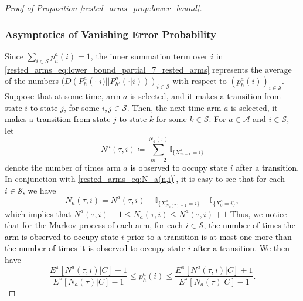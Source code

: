 \begin{proof}[Proof of Proposition \ref{rested_arms_prop:lower_bound}]
\subsubsection{Asymptotics of Vanishing Error Probability}
Since $\sum\limits_{i\in \mathcal{S}}p_h^a(i)=1$, the inner summation term over $i$ in \eqref{rested_arms_eq:lower_bound_partial_7_rested_arms} represents the average of the numbers $(D(P_h^a(\cdot|i)||P_{h'}^a(\cdot|i)))_{i\in \mathcal{S}}$ with respect to $(p_h^a(i))_{i\in \mathcal{S}}$. Suppose that at some time, arm $a$ is selected, and it \textcolor{black}{makes a transition from state $i$ to state $j$}, for some $i,j\in \mathcal{S}$. Then, the next time arm $a$ is selected, it \textcolor{black}{makes a transition from state $j$ to state $k$} for some $k\in \mathcal{S}$. For $a\in \mathcal{A}$ and $i\in \mathcal{S}$, let
\begin{equation}
N^a(\tau,i)\coloneqq\sum\limits_{m=2}^{N_a(\tau)}\mathbb{I}_{\{X_{m-1}^a=i\}}\label{rested_arms_eq:NoOfEntriesIntoStatei}
\end{equation}
denote the number of times arm $a$ \textcolor{black}{is observed to occupy state $i$ after a transition}. In conjunction with \eqref{rested_arms_eq:N_a(n,i)}, it is easy to see that for each $i\in \mathcal{S}$, we have
\begin{equation}
N_a(\tau,i)=N^a(\tau,i)-\mathbb{I}_{\{X_{N_a(\tau)-1}^a=i\}}+\mathbb{I}_{\{X_0^a=i\}},\label{rested_arms_eq:RelBtwEntryAndExitNumbersForStatei}
\end{equation}
which implies that $N^a(\tau,i)-1\leq N_a(\tau,i)\leq N^a(\tau,i)+1$  Thus, we notice that for the Markov process of each arm, for each $i\in\mathcal{S}$, \textcolor{black}{the number of times the arm is observed to occupy state $i$ prior to a transition is at most one more than the number of times it is observed to occupy state $i$ after a transition}.  We then have
\begin{equation}
\frac{E^\pi[N^a(\tau,i)|C]-1}{E^\pi[N_a(\tau)|C]-1}\leq p_h^a(i)\leq \frac{E^\pi[N^a(\tau,i)|C]+1}{E^\pi[N_a(\tau)|C]-1}.\label{rested_arms_eq:p_h^a_in_limit}
\end{equation}


\end{proof}
